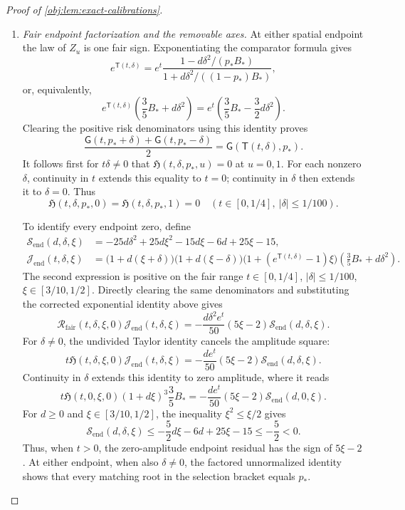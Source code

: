 \begin{proof}[Proof of \cref{obj:lem:exact-calibrations}]
\begin{enumerate}
\item \emph{Fair endpoint factorization and the removable axes.}
At either spatial endpoint the law of \(Z_u\) is one fair sign. Exponentiating the comparator formula gives
\[
e^{\mathsf T(t,\delta)}
=e^t
\frac{1-d\delta^2/(p_*B_*)}
     {1+d\delta^2/((1-p_*)B_*)},
\]
or, equivalently,
\[
e^{\mathsf T(t,\delta)}
\left(\frac35B_*+d\delta^2\right)
=
e^t\left(\frac35B_*-\frac32d\delta^2\right).
\]
Clearing the positive risk denominators using this identity proves
\[
\frac{\mathsf G(t,p_*+\delta)+\mathsf G(t,p_*-\delta)}2
=\mathsf G(\mathsf T(t,\delta),p_*).
\]
It follows first for \(t\delta\ne0\) that
\(\mathfrak H(t,\delta,p_*,u)=0\) at \(u=0,1\).
For each nonzero \(\delta\), continuity in \(t\) extends this equality to \(t=0\); continuity in \(\delta\) then extends it to \(\delta=0\). Thus
\[
\mathfrak H(t,\delta,p_*,0)
=\mathfrak H(t,\delta,p_*,1)=0
\quad
\left(t\in[0,1/4],\ |\delta|\le1/100\right).
\]

To identify every endpoint zero, define
\[
\begin{aligned}
\mathcal S_{\mathrm{end}}(d,\delta,\xi)
&=-25d\delta^2+25d\xi^2-15d\xi-6d+25\xi-15,\\
\mathcal J_{\mathrm{end}}(t,\delta,\xi)
&=\bigl(1+d(\xi+\delta)\bigr)
  \bigl(1+d(\xi-\delta)\bigr)
  \bigl(1+(e^{\mathsf T(t,\delta)}-1)\xi\bigr)
  \left(\frac35B_*+d\delta^2\right).
\end{aligned}
\]
The second expression is positive on the fair range
\(t\in[0,1/4]\), \(|\delta|\le1/100\),
\(\xi\in[3/10,1/2]\). Directly clearing the same denominators and substituting the corrected exponential identity above gives
\[
\mathcal R_{\mathrm{fair}}(t,\delta,\xi,0)
\mathcal J_{\mathrm{end}}(t,\delta,\xi)
=
-\frac{d\delta^2e^t}{50}
(5\xi-2)\mathcal S_{\mathrm{end}}(d,\delta,\xi).
\]
For \(\delta\ne0\), the undivided Taylor identity cancels the amplitude square:
\[
t\mathfrak H(t,\delta,\xi,0)
\mathcal J_{\mathrm{end}}(t,\delta,\xi)
=
-\frac{de^t}{50}
(5\xi-2)\mathcal S_{\mathrm{end}}(d,\delta,\xi).
\]
Continuity in \(\delta\) extends this identity to zero amplitude, where it reads
\[
t\mathfrak H(t,0,\xi,0)(1+d\xi)^3\frac35B_*
=
-\frac{de^t}{50}
(5\xi-2)\mathcal S_{\mathrm{end}}(d,0,\xi).
\]
For \(d\ge0\) and \(\xi\in[3/10,1/2]\), the inequality
\(\xi^2\le\xi/2\) gives
\[
\mathcal S_{\mathrm{end}}(d,\delta,\xi)
\le-\frac52d\xi-6d+25\xi-15
\le-\frac52<0.
\]
Thus, when \(t>0\), the zero-amplitude endpoint residual has the sign of \(5\xi-2\). At either endpoint, when also \(\delta\ne0\), the factored unnormalized identity shows that every matching root in the selection bracket equals \(p_*\).


\end{enumerate}
\end{proof}
